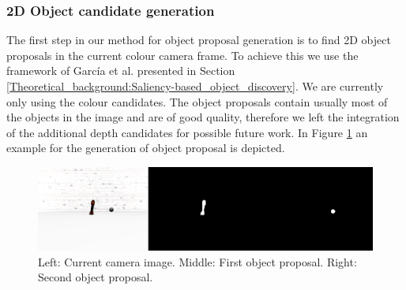 \documentclass[a4paper,11pt,english]{article}
\begin{document}
\subsubsection{2D Object candidate generation}
The first step in our method for object proposal generation is to find 2D object proposals in the current colour camera frame.
To achieve this we use the framework of García et al. presented in Section \ref{Theoretical_background:Saliency-based_object_discovery}.
We are currently only using the colour candidates. The object proposals contain usually most of the objects in the image and are of good quality, therefore we left the integration of the additional depth candidates for possible future work.
In Figure \ref{fig:object_generation} an example for the generation of object proposal is depicted.

\begin{figure}[h!]
	\begin{center}
		\includegraphics[width=1\textwidth]{src/object_generation.png}
		\caption{Left: Current camera image. Middle: First object proposal. Right: Second object proposal.}
		\label{fig:object_generation}
	\end{center}
\end{figure}
\end{document}
